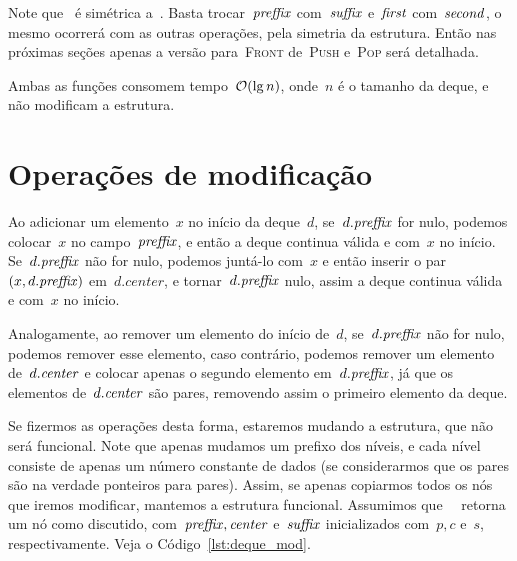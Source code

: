 \documentclass[main.tex]{subfiles}
\begin{document}
Note que~ é simétrica a~. Basta trocar~$\mathit{preffix}$ com~$\mathit{suffix}$ e~$\mathit{first}$ com~$\mathit{second}$, o mesmo ocorrerá com as outras operações, pela simetria da estrutura. Então nas próximas seções apenas a versão para~\textsc{Front} de~\textsc{Push} e~\textsc{Pop} será detalhada.

Ambas as funções consomem tempo~$\mathcal{O}(\lg n)$, onde~$n$ é o tamanho da deque, e não modificam a estrutura.

\section{Operações de modificação}

Ao adicionar um elemento~$x$ no início da deque~$d$, se~$d.\mathit{preffix}$ for nulo, podemos colocar~$x$ no campo~$\mathit{preffix}$, e então a deque continua válida e com~$x$ no início. Se~$d.\mathit{preffix}$ não for nulo, podemos juntá-lo com~$x$ e então inserir o par~$(x, d.\mathit{preffix})$ em~$d.center$, e tornar~$d.\mathit{preffix}$ nulo, assim a deque continua válida e com~$x$ no início.

Analogamente, ao remover um elemento do início de~$d$, se~$d.\mathit{preffix}$ não for nulo, podemos remover esse elemento, caso contrário, podemos remover um elemento de~$d.\mathit{center}$ e colocar apenas o segundo elemento em~$d.\mathit{preffix}$, já que os elementos de~$d.\mathit{center}$ são pares, removendo assim o primeiro elemento da deque.

Se fizermos as operações desta forma, estaremos mudando a estrutura, que não será funcional. Note que apenas mudamos um prefixo dos níveis, e cada nível consiste de apenas um número constante de dados (se considerarmos que os pares são na verdade ponteiros para pares).
Assim, se apenas copiarmos todos os nós que iremos modificar, mantemos a estrutura funcional. Assumimos que~\mbox{ } retorna um nó como discutido, com~$\mathit{preffix}, \mathit{center}$ e~$\mathit{suffix}$ inicializados com~$p, c$ e~$s$, respectivamente. Veja o Código~\ref{lst:deque_mod}.
\end{document}
